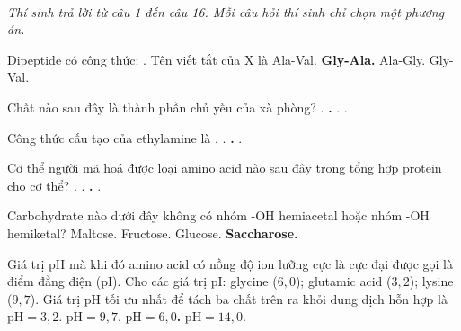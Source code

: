 \documentclass[11pt,a4paper]{article}
\begin{document}
 \\
\textit{Thí sinh trả lời từ câu 1 đến câu 16. Mỗi câu hỏi thí sinh chỉ chọn một phương án.}
\vspace{4pt}
\begin{ex}
Dipeptide có công thức: . Tên viết tắt của X là
\choice
{Ala-Val.}
{\textbf{\color{hfRed}Gly-Ala.}}
{Ala-Gly.}
{Gly-Val.}
\end{ex}
\begin{ex}
Chất nào sau đây là thành phần chủ yếu của xà phòng?
\choice
{.}
{\textbf{\color{hfRed}.}}
{.}
{.}
\end{ex}
\begin{ex}
Công thức cấu tạo của ethylamine là
\choice
{.}
{.}
{\textbf{\color{hfRed}.}}
{.}
\end{ex}
\begin{ex}
Cơ thể người mã hoá được loại amino acid nào sau đây trong tổng hợp protein cho cơ thể?
\choice
{.}
{.}
{\textbf{\color{hfRed}.}}
{.}
\end{ex}
\begin{ex}
Carbohydrate nào dưới đây không có nhóm -OH hemiacetal hoặc nhóm -OH hemiketal?
\choice
{Maltose.}
{Fructose.}
{Glucose.}
{\textbf{\color{hfRed}Saccharose.}}
\end{ex}
\begin{ex}
Giá trị pH mà khi đó amino acid có nồng độ ion lưỡng cực là cực đại được gọi là điểm đẳng điện (pI). Cho các giá trị pI: glycine ($6{,}0$); glutamic acid ($3{,}2$); lysine ($9{,}7$). Giá trị pH tối ưu nhất để tách ba chất trên ra khỏi dung dịch hỗn hợp là
\choice
{$\text{pH} = 3{,}2$.}
{$\text{pH} = 9{,}7$.}
{\textbf{\color{hfRed}$\text{pH} = 6{,}0$.}}
{$\text{pH} = 14{,}0$.}
\end{ex}
\end{document}
